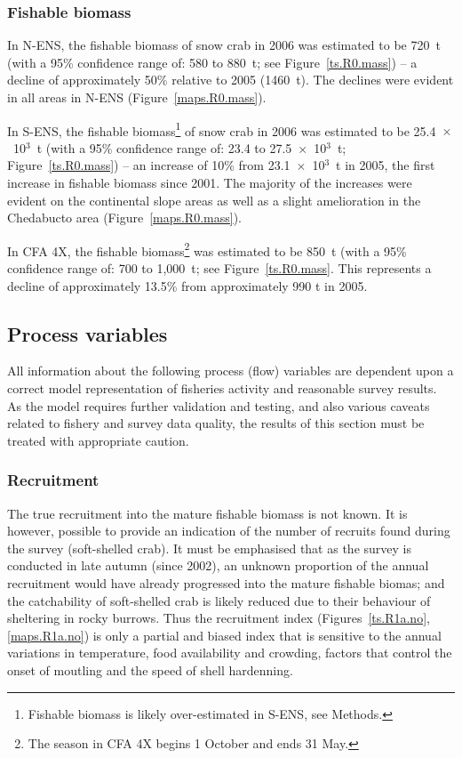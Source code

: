 \documentclass[11pt]{article}
\newcommand{\Xthou}{$\times$~10$^3$}
\begin{document}
\subsubsection{Fishable biomass}

In N-ENS, the fishable biomass of snow crab in 2006 was estimated to be 720~t (with a 95\% confidence range of: 580 to 880~t; see Figure~\ref{ts.R0.mass}) -- a decline of approximately 50\% relative to 2005 (1460~t). The declines were evident in all areas in N-ENS (Figure~\ref{maps.R0.mass}).

In S-ENS, the fishable biomass\footnote{Fishable biomass is likely over-estimated in S-ENS, see Methods.} of snow crab in 2006 was estimated to be 25.4~\Xthou~t (with a 95\% confidence range of: 23.4 to 27.5~\Xthou~t; Figure~\ref{ts.R0.mass}) -- an increase of 10\% from 23.1~\Xthou~t in 2005, the first increase in fishable biomass since 2001. The majority of the increases were evident on the continental slope areas as well as a slight amelioration in the Chedabucto area (Figure~\ref{maps.R0.mass}).

In CFA 4X, the fishable biomass\footnote{The season in CFA 4X begins 1 October and ends 31 May.} was estimated to be 850~t (with a 95\% confidence range of: 700 to 1,000~t; see Figure~\ref{ts.R0.mass}. This represents a decline of approximately 13.5\% from approximately 990 t in 2005.


\subsection{Process variables}

All information about the following process (flow) variables are dependent upon a correct model representation of fisheries activity and reasonable survey results. As the model requires further validation and testing, and also various caveats related to fishery and survey data quality, the results of this section must be treated with appropriate caution.

\subsubsection{Recruitment}

The true recruitment into the mature fishable biomass is not known. It is however, possible to provide an indication of the number of recruits found during the survey (soft-shelled crab). It must be emphasised that as the survey is conducted in late autumn (since 2002), an unknown proportion of the annual recruitment would have already progressed into the mature fishable biomas; and the catchability of soft-shelled crab is likely reduced due to their behaviour of sheltering in rocky burrows. Thus the recruitment index (Figures~\ref{ts.R1a.no}, \ref{maps.R1a.no}) is only a partial and biased index that is sensitive to the annual variations in temperature, food availability and crowding, factors that control the onset of moutling and the speed of shell hardenning. 
\end{document}
